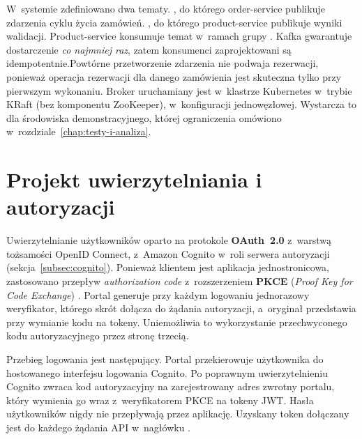 W~systemie zdefiniowano dwa tematy. , do którego order-service publikuje zdarzenia cyklu życia
zamówień. , do którego product-service publikuje wyniki walidacji. Product-service
konsumuje temat  w~ramach grupy . Kafka gwarantuje dostarczenie
\emph{co najmniej raz}, zatem konsumenci zaprojektowani są idempotentnie.Powtórne przetworzenie zdarzenia
 nie podwaja rezerwacji, ponieważ operacja rezerwacji dla danego zamówienia jest skuteczna
tylko przy pierwszym wykonaniu. Broker uruchamiany jest w~klastrze Kubernetes w~trybie KRaft (bez komponentu
ZooKeeper), w~konfiguracji jednowęzłowej. Wystarcza to dla środowiska demonstracyjnego, której ograniczenia
omówiono w~rozdziale~\ref{chap:testy-i-analiza}.

\section{Projekt uwierzytelniania i autoryzacji}
\label{sec:projekt-uwierzytelniania}

Uwierzytelnianie użytkowników oparto na protokole \textbf{OAuth~2.0} \parencite{rfc6749} z~warstwą tożsamości OpenID
Connect, z~Amazon Cognito w~roli serwera autoryzacji (sekcja~\ref{subsec:cognito}). Ponieważ klientem jest
aplikacja jednostronicowa, zastosowano przepływ \emph{authorization code} z~rozszerzeniem \textbf{PKCE} (\emph{Proof Key for Code Exchange})
\parencite{rfc7636}. Portal generuje przy każdym logowaniu jednorazowy weryfikator, którego skrót dołącza do żądania
autoryzacji, a~oryginał przedstawia przy wymianie kodu na tokeny. Uniemożliwia to wykorzystanie przechwyconego
kodu autoryzacyjnego przez stronę trzecią.

Przebieg logowania jest następujący. Portal przekierowuje użytkownika do hostowanego interfejsu logowania Cognito.
Po poprawnym uwierzytelnieniu Cognito zwraca kod autoryzacyjny na zarejestrowany adres zwrotny portalu, który
wymienia go wraz z~weryfikatorem PKCE na tokeny JWT. Hasła użytkowników nigdy nie przepływają przez
aplikację. Uzyskany token dołączany jest do każdego żądania API w~nagłówku .

